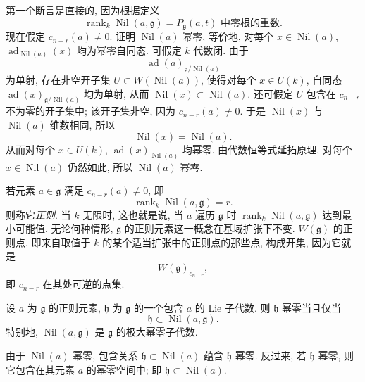 第一个断言是直接的, 因为根据定义
\[
  \operatorname{rank}_k\operatorname{Nil}(a,\mathfrak g)
  =
  P_{\mathfrak g}(a,t)\text{ 中零根的重数}.
\]
现在假定 \(c_{n-r}(a)\neq0\). 证明 \(\operatorname{Nil}(a)\) 幂零, 等价地, 对每个 \(x\in\operatorname{Nil}(a)\), \(\operatorname{ad}_{\operatorname{Nil}(a)}(x)\) 均为幂零自同态. 可假定 \(k\) 代数闭. 由于
\[
  \operatorname{ad}(a)_{\mathfrak g/\operatorname{Nil}(a)}
\]
为单射, 存在非空开子集 \(U\subset W(\operatorname{Nil}(a))\), 使得对每个 \(x\in U(k)\), 自同态 \(\operatorname{ad}(x)_{\mathfrak g/\operatorname{Nil}(a)}\) 均为单射, 从而 \(\operatorname{Nil}(x)\subset\operatorname{Nil}(a)\). 还可假定 \(U\) 包含在 \(c_{n-r}\) 不为零的开子集中; 该开子集非空, 因为 \(c_{n-r}(a)\neq0\). 于是 \(\operatorname{Nil}(x)\) 与 \(\operatorname{Nil}(a)\) 维数相同, 所以
\[
  \operatorname{Nil}(x)=\operatorname{Nil}(a).
\]
从而对每个 \(x\in U(k)\), \(\operatorname{ad}(x)_{\operatorname{Nil}(a)}\) 均幂零. 由代数恒等式延拓原理, 对每个 \(x\in\operatorname{Nil}(a)\) 仍然如此, 所以 \(\operatorname{Nil}(a)\) 幂零.

若元素 \(a\in\mathfrak g\) 满足 \(c_{n-r}(a)\neq0\), 即
\[
  \operatorname{rank}_k\operatorname{Nil}(a,\mathfrak g)=r.
\]
则称它\emph{正则}. 当 \(k\) 无限时, 这也就是说, 当 \(a\) 遍历 \(\mathfrak g\) 时 \(\operatorname{rank}_k\operatorname{Nil}(a,\mathfrak g)\) 达到最小可能值. 无论何种情形, \(\mathfrak g\) 的正则元素这一概念在基域扩张下不变. \(W(\mathfrak g)\) 的正则点, 即来自取值于 \(k\) 的某个适当扩张中的正则点的那些点, 构成开集, 因为它就是
\[
  W(\mathfrak g)_{c_{n-r}},
\]
即 \(c_{n-r}\) 在其处可逆的点集.

\begin{corollary}
设 \(a\) 为 \(\mathfrak g\) 的正则元素, \(\mathfrak h\) 为 \(\mathfrak g\) 的一个包含 \(a\) 的 Lie 子代数. 则 \(\mathfrak h\) 幂零当且仅当
\[
  \mathfrak h\subset\operatorname{Nil}(a,\mathfrak g).
\]
特别地, \(\operatorname{Nil}(a,\mathfrak g)\) 是 \(\mathfrak g\) 的极大幂零子代数.
\end{corollary}

由于 \(\operatorname{Nil}(a)\) 幂零, 包含关系 \(\mathfrak h\subset\operatorname{Nil}(a)\) 蕴含 \(\mathfrak h\) 幂零. 反过来, 若 \(\mathfrak h\) 幂零, 则它包含在其元素 \(a\) 的幂零空间中; 即 \(\mathfrak h\subset\operatorname{Nil}(a)\).

